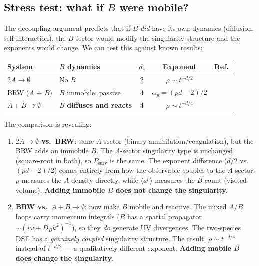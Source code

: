 \documentclass[11pt,a4paper]{article}
\theoremstyle{definition}
\newcommand{\Psurv}{P_{\mathrm{surv}}}
\begin{document}
\subsection{Stress test: what if $B$ were mobile?}

The decoupling argument predicts that if $B$ \emph{did} have its own
dynamics (diffusion, self-interaction), the $B$-sector would modify the
singularity structure and the exponents would change. We can test this
against known results:

\begin{center}
\renewcommand{\arraystretch}{1.3}
\begin{tabular}{lp{3.2cm}ccl}
\toprule
\textbf{System} & \textbf{$B$ dynamics} & $d_c$ & \textbf{Exponent} & \textbf{Ref.} \\
\midrule
$2A \to \emptyset$ & No $B$ & 2 & $\rho \sim t^{-d/2}$ & \cite{lee1994} \\[3pt]
BRW ($A$ + $B$) & $B$ immobile, passive & 4 & $\alpha_p = (pd{-}2)/2$ & \cite{bordeu2019} \\[3pt]
$A + B \to \emptyset$ & $B$ \textbf{diffuses and reacts} & 4 & $\rho \sim t^{-d/4}$ & \cite{leecardy1995} \\
\bottomrule
\end{tabular}
\end{center}

\noindent
The comparison is revealing:

\begin{enumerate}
\item \textbf{$2A \to \emptyset$ vs.\ BRW}: same $A$-sector (binary
      annihilation/coagulation), but the BRW adds an immobile $B$.
      The $A$-sector singularity type is unchanged (square-root in both),
      so $\Psurv$ is the same. The exponent difference ($d/2$ vs.\
      $(pd{-}2)/2$) comes entirely from how the observable couples to the
      $A$-sector: $\rho$ measures the $A$-density directly, while
      $\langle a^p \rangle$ measures the $B$-count (visited volume).
      \textbf{Adding immobile $B$ does not change the singularity.} \checkmark

\item \textbf{BRW vs.\ $A{+}B \to \emptyset$}: now make $B$ mobile
      and reactive. The mixed $A/B$ loops carry momentum integrals
      ($B$ has a spatial propagator $\sim (i\omega + D_B k^2)^{-1}$),
      so they \emph{do} generate UV divergences. The two-species DSE
      has a \emph{genuinely coupled} singularity structure. The result:
      $\rho \sim t^{-d/4}$ instead of $t^{-d/2}$ --- a qualitatively
      different exponent. \textbf{Adding mobile $B$ does change the
      singularity.} \checkmark
\end{enumerate}
\end{document}

